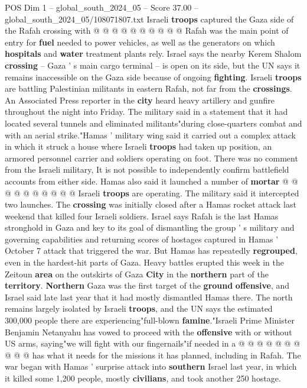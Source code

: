 \begin{textsample}{POS Dim 1 – global\_south\_2024\_05 – Score 37.00 – global\_south\_2024\_05/108071807.txt}
Israeli \textbf{troops} captured the Gaza side of the Rafah crossing with @ @ @ @ @ @ @ @ @ @ Rafah was the main point of entry for \textbf{fuel} needed to power vehicles, as well as the generators on which \textbf{hospitals} and \textbf{water} treatment plants rely.
Israel says the nearby Kerem Shalom \textbf{crossing} -- Gaza ' s main cargo terminal -- is open on its side, but the UN says it remains inaccessible on the Gaza side because of ongoing \textbf{fighting}.
Israeli \textbf{troops} are battling Palestinian militants in eastern Rafah, not far from the \textbf{crossings}.
An Associated Press reporter in the \textbf{city} heard heavy artillery and gunfire throughout the night into Friday.
The military said in a statement that it had located several tunnels and eliminated militants"during close-quarters combat and with an aerial strike."Hamas ' military wing said it carried out a complex attack in which it struck a house where Israeli \textbf{troops} had taken up position, an armored personnel carrier and soldiers operating on foot.
There was no comment from the Israeli military, It is not possible to independently confirm battlefield accounts from either side.
Hamas also said it launched a number of \textbf{mortar} @ @ @ @ @ @ @ @ @ @ Israeli \textbf{troops} are operating.
The military said it intercepted two launches.
The \textbf{crossing} was initially closed after a Hamas rocket attack last weekend that killed four Israeli soldiers.
Israel says Rafah is the last Hamas stronghold in Gaza and key to its goal of dismantling the group ' s military and governing capabilities and returning scores of hostages captured in Hamas ' October 7 attack that triggered the war.
But Hamas has repeatedly \textbf{regrouped}, even in the hardest-hit parts of Gaza.
Heavy battles erupted this week in the Zeitoun \textbf{area} on the outskirts of Gaza \textbf{City} in the \textbf{northern} part of the \textbf{territory}. \textbf{Northern} Gaza was the first target of the \textbf{ground} \textbf{offensive}, and Israel said late last year that it had mostly dismantled Hamas there.
The north remains largely isolated by Israeli \textbf{troops}, and the UN says the estimated 300,000 people there are experiencing"full-blown \textbf{famine}."Israeli Prime Minister Benjamin Netanyahu has vowed to proceed with the \textbf{offensive} with or without US arms, saying"we will fight with our fingernails"if needed in a @ @ @ @ @ @ @ @ @ @ has what it needs for the missions it has planned, including in Rafah.
The war began with Hamas ' surprise attack into \textbf{southern} Israel last year, in which it killed some 1,200 people, mostly \textbf{civilians}, and took another 250 hostage.

\end{textsample}
